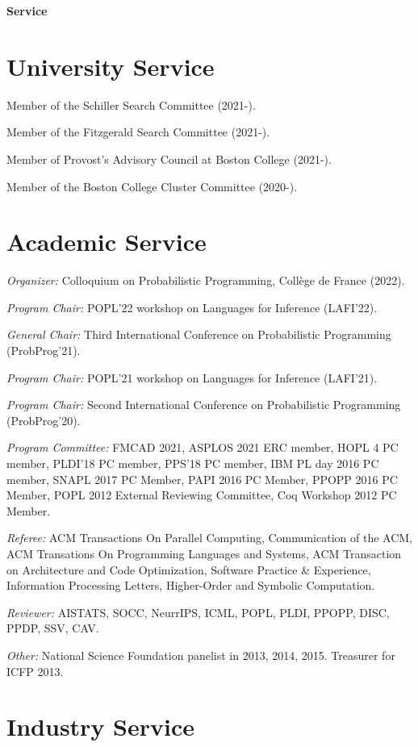 \documentclass[margin,line]{res}
\begin{document}
\begin{resume}
\newpage
  {\bf {\Large Service}}

\section{\sc University Service}

Member of the Schiller Search Committee (2021-).

Member of the Fitzgerald Search Committee (2021-).

Member of Provost's Advisory Council at Boston College (2021-).

Member of the Boston College Cluster Committee (2020-).

\section{\sc Academic Service}

{\em Organizer:} Colloquium on Probabilistic Programming, Coll\`ege de France (2022).

{\em Program Chair:} POPL'22 workshop on Languages for Inference (LAFI'22).

{\em General Chair:} Third International Conference on Probabilistic Programming (ProbProg'21).

{\em Program Chair:} POPL'21 workshop on Languages for Inference (LAFI'21).

{\em Program Chair:} Second International Conference on Probabilistic Programming (ProbProg'20).

{\em Program Committee:} FMCAD 2021, ASPLOS 2021 ERC member, HOPL 4 PC member,
PLDI'18 PC member, PPS'18 PC member, IBM PL day 2016 PC member, SNAPL
2017 PC Member, PAPI 2016 PC Member, PPOPP 2016 PC Member, POPL 2012
External Reviewing Committee, Coq Workshop 2012 PC Member.

{\em Referee:} ACM Transactions On Parallel Computing, Communication of the ACM, ACM Transations On Programming Languages and Systems, ACM Transaction on Architecture and Code Optimization, 
Software Practice \& Experience, Information Processing Letters, Higher-Order and Symbolic Computation.

{\em Reviewer:} AISTATS, SOCC, NeurrIPS, ICML, POPL, PLDI, PPOPP, DISC, PPDP, SSV,
CAV.

{\em Other:} National Science Foundation panelist in 2013, 2014, 2015. Treasurer for ICFP 2013.

\section{\sc Industry Service}


\end{resume}
\end{document}
